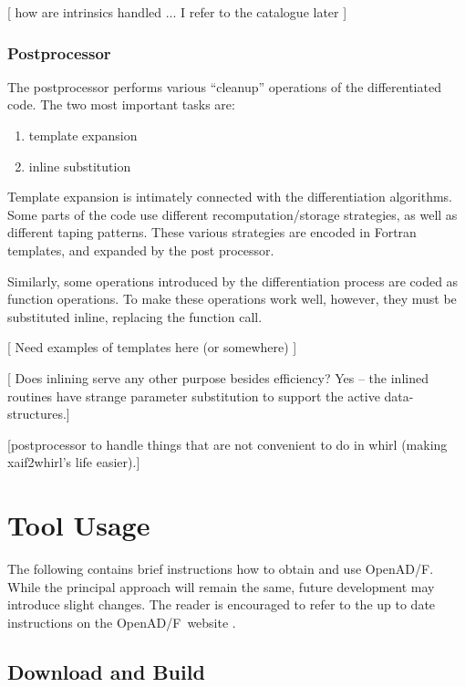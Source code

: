 \documentclass[11pt]{article}
\newcommand{\OpenADF}{OpenAD/F}
\begin{document}
{\color{red} [ how are intrinsics handled ... I refer to the catalogue later  ] }



\subsubsection{Postprocessor}\label{sssec:PostProcessor}
The postprocessor performs various ``cleanup'' operations of the
differentiated code. The two most important tasks are:
\begin{enumerate}
\item template expansion
\item inline substitution
\end{enumerate}

Template expansion is intimately connected with the differentiation
algorithms. Some parts of the code use different recomputation/storage
strategies, as well as different taping patterns. These various
strategies are encoded in Fortran templates, and expanded by the
post processor.

Similarly, some operations introduced by the differentiation process
are coded as function operations. To make these operations work well,
however, they must be substituted inline, replacing the function call.

{\color{red}
[ Need examples of templates here (or somewhere) ]

[ Does inlining serve any other purpose besides efficiency?  Yes --
the inlined routines have strange parameter substitution to support
the active data-structures.]

[postprocessor to handle things that are not convenient to do in whirl
(making xaif2whirl's life easier).]
}



\section{Tool Usage} \label{sec:Usage}
The following contains brief instructions how to obtain and use \OpenADF. 
While the principal approach will remain the same, future development may 
introduce slight changes. The reader is encouraged to refer to the 
up to date instructions on the \OpenADF\ website \cite{openadWeb}.
\subsection{Download and Build}\label{ssec:dab}
\end{document}
